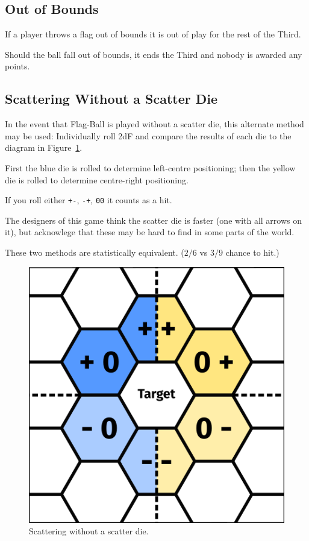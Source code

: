 \subsection{Out of Bounds}
If a player throws a flag out of bounds it is out of play for the rest of the Third.

Should the ball fall out of bounds, it ends the Third and nobody is awarded any points.

\subsection{Scattering Without a Scatter Die}
In the event that Flag-Ball is played without a scatter die, this alternate method may be used:
Individually roll 2dF and compare the results of each die to the diagram in Figure~\ref{fig:scatter-alternative}.

First the blue die is rolled to determine left-centre positioning; then the yellow die is rolled to determine centre-right positioning.

If you roll either \texttt{+-}, \texttt{-+}, \texttt{00} it counts as a hit.

\begin{note}
The designers of this game think the scatter die is faster (one with all arrows on it), but acknowlege that these may be hard to find in some parts of the world.

These two methods are statistically equivalent. ($2/6$ vs $3/9$ chance to hit.)
\end{note}

\begin{figure}
    \centering
    \includegraphics{graphics/scatter.png}
    \caption{Scattering without a scatter die.}
    \label{fig:scatter-alternative}
\end{figure}